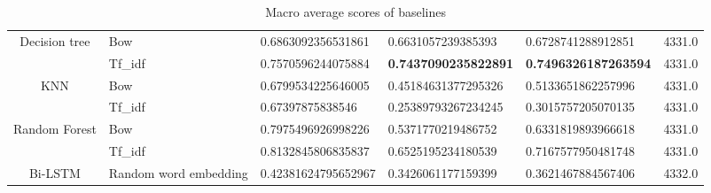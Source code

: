 \begin{table}[h!]
{\begin{tabular}{@{}clllll@{}}
\multicolumn{1}{|c|}{\multirow{2}{*}{Decision tree}} &
  \multicolumn{1}{l|}{Bow} &
  \multicolumn{1}{l|}{0.6863092356531861} &
  \multicolumn{1}{l|}{0.6631057239385393} &
  \multicolumn{1}{l|}{0.6728741288912851} &
  \multicolumn{1}{l|}{4331.0} \\ \cmidrule(l){2-6} 
\multicolumn{1}{|c|}{} &
  \multicolumn{1}{l|}{Tf\_idf} &
  \multicolumn{1}{l|}{0.7570596244075884} &
  \multicolumn{1}{l|}{\textbf{0.7437090235822891}} &
  \multicolumn{1}{l|}{\textbf{0.7496326187263594}} &
  \multicolumn{1}{l|}{4331.0} \\ \midrule
\multicolumn{1}{|c|}{\multirow{2}{*}{KNN}} &
  \multicolumn{1}{l|}{Bow} &
  \multicolumn{1}{l|}{0.6799534225646005} &
  \multicolumn{1}{l|}{0.45184631377295326} &
  \multicolumn{1}{l|}{0.5133651862257996} &
  \multicolumn{1}{l|}{4331.0} \\ \cmidrule(l){2-6} 
\multicolumn{1}{|c|}{} &
  \multicolumn{1}{l|}{Tf\_idf} &
  \multicolumn{1}{l|}{0.67397875838546} &
  \multicolumn{1}{l|}{0.25389793267234245} &
  \multicolumn{1}{l|}{0.3015757205070135} &
  \multicolumn{1}{l|}{4331.0} \\ \midrule
\multicolumn{1}{|l|}{\multirow{2}{*}{Random Forest}} &
  \multicolumn{1}{l|}{Bow} &
  \multicolumn{1}{l|}{0.7975496926998226} &
  \multicolumn{1}{l|}{0.5371770219486752} &
  \multicolumn{1}{l|}{0.6331819893966618} &
  \multicolumn{1}{l|}{4331.0} \\ \cmidrule(l){2-6} 
\multicolumn{1}{|l|}{} &
  \multicolumn{1}{l|}{Tf\_idf} &
  \multicolumn{1}{l|}{0.8132845806835837} &
  \multicolumn{1}{l|}{0.6525195234180539} &
  \multicolumn{1}{l|}{0.7167577950481748} &
  \multicolumn{1}{l|}{4331.0} \\ \midrule
\multicolumn{1}{|c|}{Bi-LSTM} &
  \multicolumn{1}{l|}{Random word embedding} &
  \multicolumn{1}{l|}{0.42381624795652967} &
  \multicolumn{1}{l|}{0.3426061177159399} &
  \multicolumn{1}{l|}{0.3621467884567406} &
  \multicolumn{1}{l|}{4332.0} \\ \bottomrule
\end{tabular}%
}
\caption{Macro average scores of baselines}
\label{tab:Macro-avg-baselines}
\end{table}